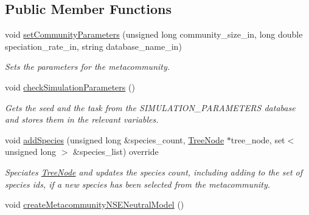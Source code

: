 \subsection*{Public Member Functions}
\begin{DoxyCompactItemize}
\item 
void \hyperlink{class_metacommunity_af9407da2a2e99848ac11ce3a426d4c8a}{set\+Community\+Parameters} (unsigned long community\+\_\+size\+\_\+in, long double speciation\+\_\+rate\+\_\+in, string database\+\_\+name\+\_\+in)
\begin{DoxyCompactList}\small\item\em Sets the parameters for the metacommunity. \end{DoxyCompactList}\item 
void \hyperlink{class_metacommunity_ad3775b6cecab860b008d15cc9c7650ea}{check\+Simulation\+Parameters} ()
\begin{DoxyCompactList}\small\item\em Gets the seed and the task from the S\+I\+M\+U\+L\+A\+T\+I\+O\+N\+\_\+\+P\+A\+R\+A\+M\+E\+T\+E\+RS database and stores them in the relevant variables. \end{DoxyCompactList}\item 
void \hyperlink{class_metacommunity_a8cad1a5648ff5b6b51f2441898fdad48}{add\+Species} (unsigned long \&species\+\_\+count, \hyperlink{class_tree_node}{Tree\+Node} $\ast$tree\+\_\+node, set$<$ unsigned long $>$ \&species\+\_\+list) override
\begin{DoxyCompactList}\small\item\em Speciates \hyperlink{class_tree_node}{Tree\+Node} and updates the species count, including adding to the set of species ids, if a new species has been selected from the metacommunity. \end{DoxyCompactList}\item 
void \hyperlink{class_metacommunity_a2557f1dc48f4a7aba97431ac8a8c7dbd}{create\+Metacommunity\+N\+S\+E\+Neutral\+Model} ()\hypertarget{class_metacommunity_a2557f1dc48f4a7aba97431ac8a8c7dbd}{}\label{class_metacommunity_a2557f1dc48f4a7aba97431ac8a8c7dbd}


\end{DoxyCompactItemize}
